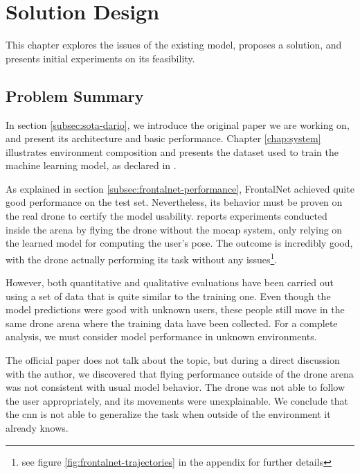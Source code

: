 \chapter{Solution Design}
\label{chap:design}


This chapter explores the issues of the existing model, proposes a solution, and presents initial experiments on its feasibility.




\section{Problem Summary}
\label{sec:frontalnet-generalization}

In section \ref{subsec:sota-dario}, we introduce the original paper we are working on, and present its architecture and basic performance. Chapter \ref{chap:system} illustrates environment composition and presents the dataset used to train the machine learning model, as declared in \cite{mantegazza2019visionbased}.

\medskip

As explained in section \ref{subsec:frontalnet-performance}, FrontalNet achieved quite good performance on the test set. Nevertheless, its behavior must be proven on the real drone to certify the model usability. \cite{mantegazza2019visionbased} reports experiments conducted inside the arena by flying the drone without the \gls{mocap} system, only relying on the learned model for computing the user's pose. The outcome is incredibly good, with the drone actually performing its task without any issues\footnote{see figure \ref{fig:frontalnet-trajectories} in the appendix for further details}.

However, both quantitative and qualitative evaluations have been carried out using a set of data that is quite similar to the training one. Even though the model predictions were good with unknown users, these people still move in the same drone arena where the training data have been collected. For a complete analysis, we must consider model performance in unknown environments.

The official paper does not talk about the topic, but during a direct discussion with the author, we discovered that flying performance outside of the drone arena was not consistent with usual model behavior. The drone was not able to follow the user appropriately, and its movements were unexplainable. We conclude that the \gls{cnn} is not able to generalize the task when outside of the environment it already knows.

